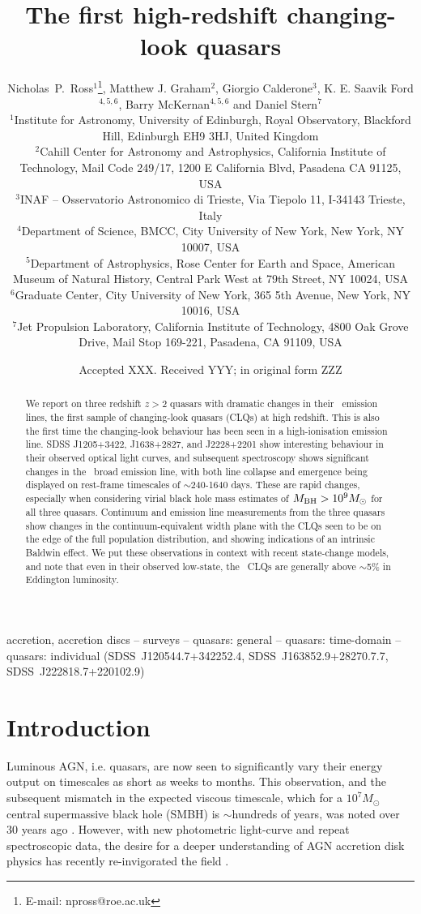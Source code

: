 \documentclass[fleqn,usenatbib]{mnras}
\title[High-redshift CLQs]{The first high-redshift changing-look quasars}
\author[Ross {\it et al.}]
{Nicholas~P.~Ross$^{1}$\thanks{E-mail: npross@roe.ac.uk},
Matthew J. Graham$^{2}$,
Giorgio Calderone$^{3}$, 
K. E. Saavik Ford$^{4,5,6}$,  
\newauthor Barry McKernan$^{4,5,6}$ and Daniel Stern$^{7}$  
\\
$^{1}$Institute for Astronomy, University of Edinburgh, Royal Observatory, Blackford Hill, Edinburgh EH9 3HJ, United Kingdom \\
$^{2}$Cahill Center for Astronomy and Astrophysics, California Institute of Technology, Mail Code 249/17, 1200 E California Blvd, Pasadena CA 91125, USA\\
$^{3}$INAF -- Osservatorio Astronomico di Trieste, Via Tiepolo 11, I-34143 Trieste, Italy \\
$^{4}$Department of Science, BMCC, City University of New York, New York, NY 10007, USA \\
$^{5}$Department of Astrophysics, Rose Center for Earth and Space, American Museum of Natural History, Central Park West at 79th Street, NY 10024, USA \\
$^{6}$Graduate Center, City University of New York, 365 5th Avenue, New York, NY 10016, USA\\
$^{7}$Jet Propulsion Laboratory, California Institute of Technology, 4800 Oak Grove Drive, Mail Stop 169-221, Pasadena, CA 91109, USA \\
}
\date{Accepted XXX. Received YYY; in original form ZZZ}
\begin{document}
\label{firstpage}
\pagerange{\pageref{firstpage}--\pageref{lastpage}}
\maketitle

\begin{abstract}
We report on three redshift $z>2$ quasars with dramatic changes in
their \civ\ emission lines, the first sample of changing-look quasars
(CLQs) at high redshift.  This is also the first time the
changing-look behaviour has been seen in a high-ionisation emission
line.  SDSS J1205+3422, J1638+2827, and J2228+2201 show interesting
behaviour in their observed optical light curves, and subsequent
spectroscopy shows significant changes in the \civ\ broad emission
line, with both line collapse and emergence being displayed on
rest-frame timescales of $\sim$240-1640 days.  These are rapid
changes, especially when considering virial black hole mass estimates
of $M_{\rm BH} > 10^{9} M_{\odot}$ for all three quasars.  Continuum
and emission line measurements from the three quasars show changes in
the continuum-equivalent width plane with the CLQs seen to be on the
edge of the full population distribution, and showing indications of
an intrinsic Baldwin effect. We put these observations in context with
recent state-change models, and note that even in their observed
low-state, the \civ\ CLQs are generally above $\sim$5\% in Eddington
luminosity. 
\end{abstract}

\begin{keywords}
accretion, accretion discs -- surveys -- quasars: general -- quasars:
time-domain -- quasars: individual (SDSS~J120544.7+342252.4,
SDSS~J163852.9+28270.7.7, SDSS~J222818.7+220102.9)
\end{keywords}


\section{Introduction}
Luminous AGN, i.e. quasars, are now seen to significantly vary their
energy output on timescales as short as weeks to months.  This
observation, and the subsequent mismatch in the expected viscous
timescale, which for a $10^{7} M_{\odot}$ central supermassive black
hole (SMBH) is $\sim$hundreds of years, was noted over 30 years ago
\citep[e.g.][]{Alloin1985}. However, with new photometric light-curve
and repeat spectroscopic data, the desire for a deeper understanding
of AGN accretion disk physics has recently re-invigorated the field
\citep[e.g.,][]{Antonucci2018, Lawrence2018, Ross2018, Stern2018}.
\end{document}
